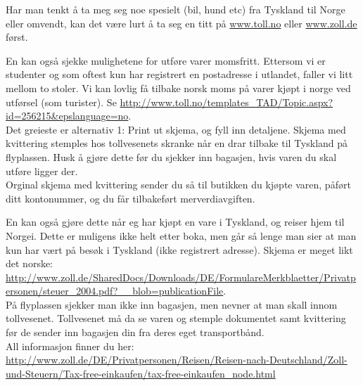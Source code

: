 Har man tenkt å ta meg seg noe spesielt (bil, hund etc) fra Tyskland til Norge eller omvendt, kan det være lurt å ta seg en titt på \href{http://www.toll.no}{www.toll.no} eller  \href{http://www.zoll.de}{www.zoll.de} først.

En kan også sjekke mulighetene for utføre varer momsfritt. Ettersom vi er studenter og som oftest kun har registrert en postadresse i utlandet, faller vi litt mellom to stoler. Vi kan lovlig få tilbake norsk moms på varer kjøpt i norge ved utførsel (som turister). Se \url{http://www.toll.no/templates_TAD/Topic.aspx?id=256215&epslanguage=no}. \\
Det greieste er alternativ 1: Print ut skjema, og fyll inn detaljene. Skjema med kvittering stemples hos tollvesenets skranke når en drar tilbake til Tyskland på flyplassen. Husk å gjøre dette før du sjekker inn bagasjen, hvis varen du skal utføre ligger der.\\
Orginal skjema med kvittering sender du så til butikken du kjøpte varen, påført ditt kontonummer, og du får tilbakeført merverdiavgiften.


En kan også gjøre dette når eg har kjøpt en vare i Tyskland, og reiser hjem til Norgei. Dette er muligens ikke helt etter boka, men går så lenge man sier at man kun har vært på besøk i Tyskland (ikke registrert adresse). Skjema er meget likt det norske: \url{http://www.zoll.de/SharedDocs/Downloads/DE/FormulareMerkblaetter/Privatpersonen/steuer_2004.pdf?__blob=publicationFile}. \\
På flyplassen sjekker man ikke inn bagasjen, men nevner at man skall innom tollvesenet. Tollvesenet må da se varen og stemple dokumentet samt kvittering før de sender inn bagasjen din fra deres eget transportbånd. \\
All informasjon finner du her: \url{http://www.zoll.de/DE/Privatpersonen/Reisen/Reisen-nach-Deutschland/Zoll-und-Steuern/Tax-free-einkaufen/tax-free-einkaufen_node.html}


